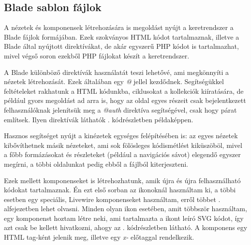 \documentclass[
]{thesis-ekf}
\theoremstyle{definition}
\theoremstyle{remark}
\begin{document}


\subsection{Blade sablon fájlok}
\label{bladeSection}

A nézetek és komponensek létrehozására is megoldást nyújt a keretrendszer a Blade\cite{blade} fájlok formájában. Ezek szokványos HTML\cite{html} kódot tartalmaznak, illetve a Blade által nyújtott direktívákat, de akár egyszerű PHP kódot is tartalmazhat, mivel végső soron ezekből PHP fájlokat készít a keretrendszer.

A Blade különböző direktívák használatát teszi lehetővé, ami megkönnyíti a nézetek létrehozását. Ezek általában egy \emph{@} jellel kezdődnek. Segítségükkel feltételeket rakhatunk a HTML kódunkba, ciklusokat a kollekciók kiíratására, de például gyors megoldást ad arra is, hogy az oldal egyes részeit csak bejelentkezett felhasználóknak jelenítsük meg a \emph{@auth} direktíva segítségével, csak hogy párat említsek. Ilyen direktívák láthatók . kódrészletben példaképpen.



Hasznos segítséget nyújt a kinézetek egységes felépítésében is: az egyes nézetek kibővíthetnek másik nézeteket, ami sok fölösleges kódismétlést kiküszöböl, mivel a főbb formázásokat és részleteket (például a navigációs sávot) elegendő egyszer megírni, a többi oldalunkat pedig ebből a fájlból kiterjeszteni.

Ezek mellett komponenseket is létrehozhatunk, amik újra és újra felhasználható kódokat tartalmaznak. Én ezt első sorban az ikonoknál használtam ki, a többi esetben egy speciális, Livewire komponenseket használtam, erről többet . alfejezetben lehet olvasni. Minden olyan ikon esetében, amit többször használtam, egy komponenst hoztam létre neki, ami tartalmazta a ikont leíró SVG kódot, így azt csak be kellett hivatkozni, ahogy az . kódrészletben látható. A komponens egy HTML tag-ként jelenik meg, illetve egy \emph{x-} előtaggal rendelkezik.


\end{document}
